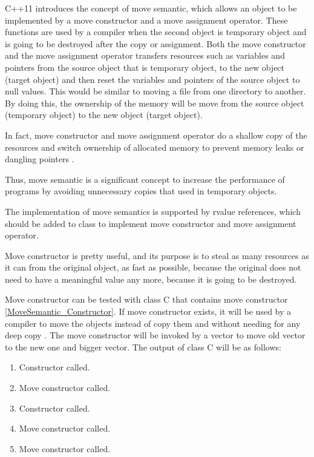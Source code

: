 \documentclass[11pt]{report}
\begin{document}
C++11 introduces the concept of move semantic, which allows an object to be implemented by a move constructor and a move assignment operator. These functions are used by a compiler when the second object is temporary object and is going to be destroyed after the copy or assignment. Both the move constructor and the move assignment operator transfers resources such as variables and pointers from the source object that is temporary object, to the new object (target object) and then reset the variables and pointers of the source object to null values. This would be similar to moving a file from one directory to another. By doing this, the ownership of the memory will be move from the source object (temporary object) to the new object (target object).


In fact, move constructor and move assignment operator do a shallow copy of the resources and switch ownership of allocated memory to prevent memory leaks or dangling pointers \cite{Gregorie:professionalcpp}.


Thus, move semantic is a significant concept to increase the performance of programs by avoiding unnecessary copies that used in temporary objects.


The implementation of move semantics is supported by rvalue references, which should be added to class to implement move constructor and move assignment operator.


Move constructor is pretty useful, and its purpose is to steal as many resources as it can from the original object, as fast as possible, because the original does not need to have a meaningful value any more, because it is going to be destroyed. 


Move constructor can be tested with class C that contains move constructor \ref{MoveSemantic_Constructor}. If move constructor exists, it will be used by a compiler to move the objects instead of copy them and without needing for any deep copy \cite{MSDN:2012:CppModern}. The move constructor will be invoked by a vector to move old vector to the new one and bigger vector. The output of class C will be as follows:

\begin{enumerate}
\item Constructor called.
\item Move constructor called.
\item Constructor called.
\item Move constructor called.
\item Move constructor called.
\end{enumerate}
\end{document}
